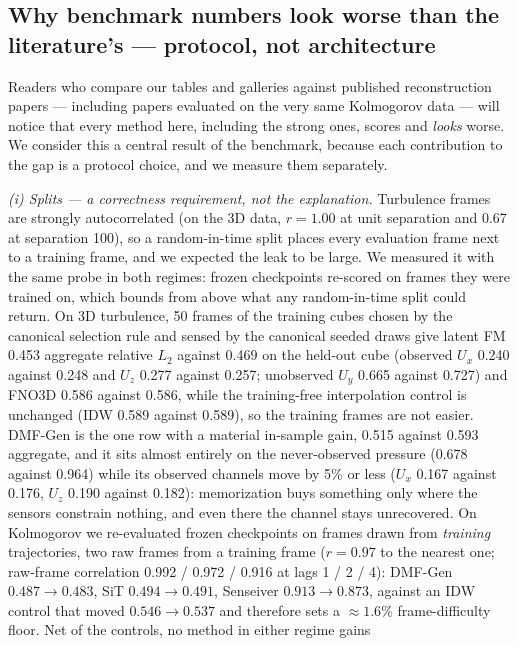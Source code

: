 \documentclass[aip,pof,reprint,amsmath,amssymb,superscriptaddress]{revtex4-1}
\newcommand{\dmfgen}{DMF-Gen}
\begin{document}
\subsection{Why benchmark numbers look worse than the literature's ---
protocol, not architecture}\label{sec:leakage}

Readers who compare our tables and galleries against published
reconstruction papers --- including papers evaluated on the very same
Kolmogorov data\cite{shu2023physics} --- will notice that every method here,
including the strong ones, scores and \emph{looks} worse. We consider this a
central result of the benchmark, because each contribution to the gap is a
protocol choice, and we measure them separately.

\emph{(i) Splits --- a correctness requirement, not the explanation.}
Turbulence frames are strongly autocorrelated (on the 3D data, $r=1.00$ at
unit separation and 0.67 at separation 100), so a random-in-time split places
every evaluation frame next to a training frame, and we expected the leak to
be large. We measured it with the same probe in both regimes: frozen
checkpoints re-scored on frames they were trained on, which bounds from above
what any random-in-time split could return. On 3D turbulence, 50 frames of
the training cubes chosen by the canonical selection rule and sensed by the
canonical seeded draws give latent FM 0.453 aggregate relative $L_2$ against
0.469 on the held-out cube (observed $U_x$ 0.240 against 0.248 and $U_z$
0.277 against 0.257; unobserved $U_y$ 0.665 against 0.727) and FNO3D 0.586
against 0.586, while the training-free interpolation control is unchanged
(IDW 0.589 against 0.589), so the training frames are not easier. \dmfgen{}
is the one row with a material in-sample gain, 0.515 against 0.593
aggregate, and it sits almost entirely on the never-observed pressure (0.678
against 0.964) while its observed channels move by 5\% or less ($U_x$ 0.167
against 0.176, $U_z$ 0.190 against 0.182): memorization buys something only
where the sensors constrain nothing, and even there the channel stays
unrecovered.
On Kolmogorov we re-evaluated frozen checkpoints on frames drawn from
\emph{training} trajectories, two raw frames from a training frame ($r =
0.97$ to the nearest one; raw-frame correlation 0.992 / 0.972 / 0.916 at
lags 1 / 2 / 4): \dmfgen{} $0.487 \rightarrow 0.483$, SiT $0.494 \rightarrow
0.491$, Senseiver $0.913 \rightarrow 0.873$, against an IDW control that
moved $0.546 \rightarrow 0.537$ and therefore sets a ${\approx}1.6\%$
frame-difficulty floor. Net of the controls, no method in either regime gains
\end{document}
